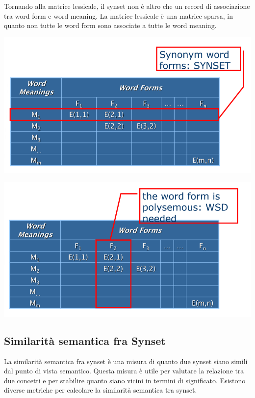 \documentclass{report}
\begin{document}
	Tornando alla matrice lessicale, il synset non è altro che un record di associazione tra word form e word meaning. La matrice lessicale è una matrice sparsa, in quanto non tutte le word form sono associate a tutte le word meaning.
	\begin{center}
		\includegraphics[scale=0.5]{assets/lex-mat-syn.png}
	\end{center}
	\begin{center}
		\includegraphics[scale=0.5]{assets/lex-mat-pol.png}
	\end{center}

	\subsection{Similarità semantica fra Synset}
	La similarità semantica fra synset è una misura di quanto due synset siano simili dal punto di vista semantico. Questa misura è utile per valutare la relazione tra due concetti e per stabilire quanto siano vicini in termini di significato. Esistono diverse metriche per calcolare la similarità semantica tra synset.
	
\end{document}
